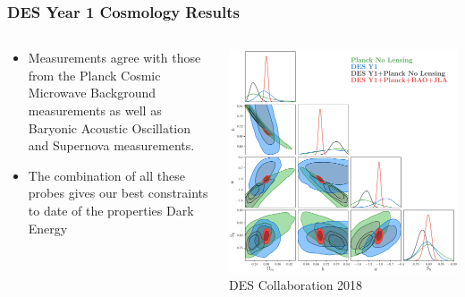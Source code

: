 \documentclass[aspectratio=169]{beamer}
\begin{document}
\frame
{

    \frametitle{DES Year 1 Cosmology Results}


    \begin{columns}
        \begin{column}{0.5\textwidth}
            \begin{itemize}

                \item Measurements agree with those from the
                    Planck Cosmic Microwave Background measurements
                    as well as Baryonic Acoustic Oscillation
                    and Supernova measurements.

                \item The combination  of all these probes gives
                    our best constraints to date of the properties
                    Dark Energy

            \end{itemize}

        \end{column}
        \begin{column}{0.5\textwidth}
            \centering
                \includegraphics[width=\linewidth]{dpnl_w_4.pdf}
                \newline
                {\tiny DES Collaboration 2018}
        \end{column}

    \end{columns}

}
\end{document}
